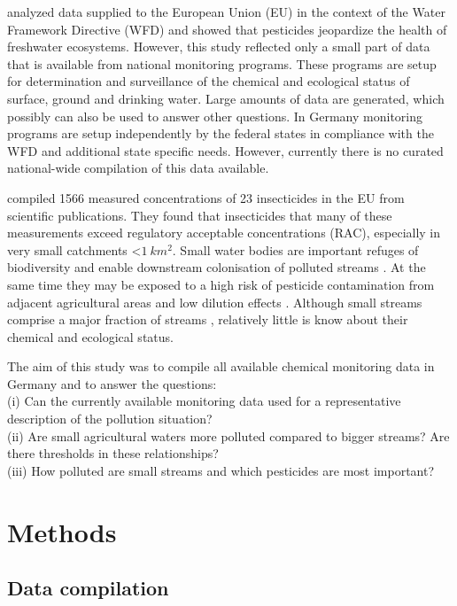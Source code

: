 \documentclass[journal=esthag,manuscript=article]{achemso}
\begin{document}
\citet{malaj_organic_2014} analyzed data supplied to the European Union (EU) in the context of the Water Framework Directive (WFD) and showed that pesticides jeopardize the health of freshwater ecosystems.
However, this study reflected only a small part of data that is available from national monitoring programs.
These programs are setup for determination and surveillance of the chemical and ecological status of surface, ground and drinking water.
Large amounts of data are generated, which possibly can also be used to answer other questions.
In Germany monitoring programs are setup independently by the federal states in compliance with the WFD \citep{quevauviller_water_2008} and additional state specific needs.
However, currently there is no curated national-wide compilation of this data available.

\citet{stehle_pesticide_2015} compiled 1566 measured concentrations of 23 insecticides in the EU from scientific publications. 
They found that insecticides that many of these measurements exceed regulatory acceptable concentrations (RAC), especially in very small catchments \textless $1~km^2$.
Small water bodies are important refuges of biodiversity \citep{davies_comparison_2008} and enable downstream colonisation of polluted streams \citep{liess_analyzing_2005}.
At the same time they may be exposed to a high risk of pesticide contamination from adjacent agricultural areas and low dilution effects \citep{liess_determination_1999}.
Although small streams comprise a major fraction of streams \citep{nadeau_hydrological_2007}, relatively little is know about their chemical and ecological status.

The aim of this study was to compile all available chemical monitoring data in Germany and to answer the questions: \\
(i) Can the currently available monitoring data used for a representative description of the pollution situation? \\
(ii) Are small agricultural waters more polluted compared to bigger streams? Are there thresholds in these relationships? \\
(iii) How polluted are small streams and which pesticides are most important?


\section{Methods}
\subsection{Data compilation}
\end{document}
